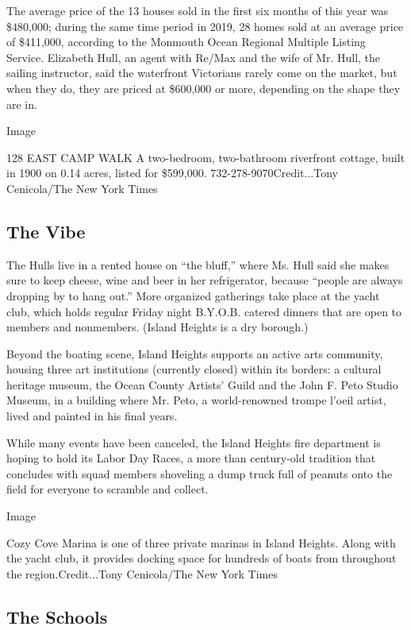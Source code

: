 The average price of the 13 houses sold in the first six months of this
year was \$480,000; during the same time period in 2019, 28 homes sold
at an average price of \$411,000, according to the Monmouth Ocean
Regional Multiple Listing Service. Elizabeth Hull, an agent with Re/Max
and the wife of Mr. Hull, the sailing instructor, said the waterfront
Victorians rarely come on the market, but when they do, they are priced
at \$600,000 or more, depending on the shape they are in.

Image

128 EAST CAMP WALK \textbar{} A two-bedroom, two-bathroom riverfront
cottage, built in 1900 on 0.14 acres, listed for \$599,000.
732-278-9070Credit...Tony Cenicola/The New York Times

\hypertarget{the-vibe}{%
\subsection{The Vibe}\label{the-vibe}}

The Hulls live in a rented house on ``the bluff,'' where Ms. Hull said
she makes sure to keep cheese, wine and beer in her refrigerator,
because ``people are always dropping by to hang out.'' More organized
gatherings take place at the yacht club, which holds regular Friday
night B.Y.O.B. catered dinners that are open to members and nonmembers.
(Island Heights is a dry borough.)

Beyond the boating scene, Island Heights supports an active arts
community, housing three art institutions (currently closed) within its
borders: a cultural heritage museum, the Ocean County Artists' Guild and
the John F. Peto Studio Museum, in a building where Mr. Peto, a
world-renowned trompe l'oeil artist, lived and painted in his final
years.

While many events have been canceled, the Island Heights fire department
is hoping to hold its Labor Day Races, a more than century-old tradition
that concludes with squad members shoveling a dump truck full of peanuts
onto the field for everyone to scramble and collect.

Image

Cozy Cove Marina is one of three private marinas in Island Heights.
Along with the yacht club, it provides docking space for hundreds of
boats from throughout the region.Credit...Tony Cenicola/The New York
Times

\hypertarget{the-schools}{%
\subsection{The Schools}\label{the-schools}}

